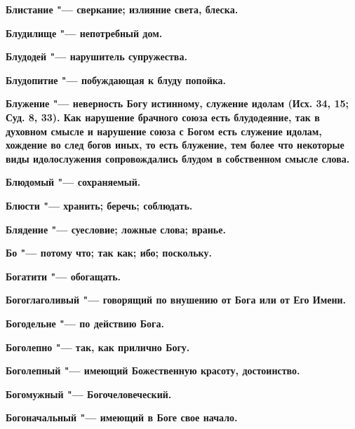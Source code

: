 \bfseries Блистание \normalfont{} "--- сверкание; излияние света, блеска. 




\bfseries Блудилище \normalfont{} "--- непотребный дом. 




\bfseries Блудодей \normalfont{} "--- нарушитель супружества. 




\bfseries Блудопитие \normalfont{} "--- побуждающая к блуду попойка. 




\bfseries Блужение \normalfont{} "--- неверность Богу истинному, служение идолам (Исх. 34, 15; Суд. 8, 33). Как нарушение брачного союза есть блудодеяние, так в духовном смысле и нарушение союза с Богом есть служение идолам, хождение во след богов иных, то есть блужение, тем более что некоторые виды идолослужения сопровождались блудом в собственном смысле слова. 




\bfseries Блюдомый \normalfont{} "--- сохраняемый. 




\bfseries Блюсти \normalfont{} "--- хранить; беречь; соблюдать. 




\bfseries Блядение \normalfont{} "--- суесловие; ложные слова; вранье. 




\bfseries Бо \normalfont{} "--- потому что; так как; ибо; поскольку. 




\bfseries Богатити \normalfont{} "--- обогащать. 




\bfseries Богоглаголивый \normalfont{} "--- говорящий по внушению от Бога или от Его Имени. 




\bfseries Богодельне \normalfont{} "--- по действию Бога. 




\bfseries Боголепно \normalfont{} "--- так, как прилично Богу. 




\bfseries Боголепный \normalfont{} "--- имеющий Божественную красоту, достоинство. 




\bfseries Богомужный \normalfont{} "--- Богочеловеческий. 




\bfseries Богоначальный \normalfont{} "--- имеющий в Боге свое начало. 




